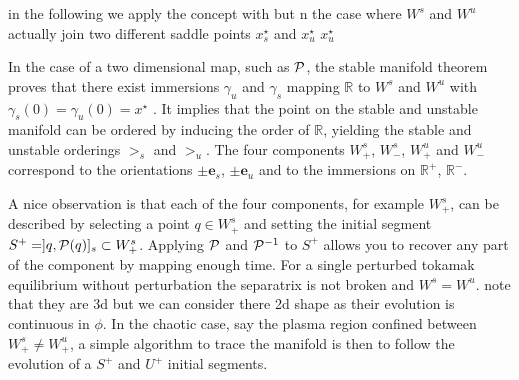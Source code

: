 in the following we apply the concept with but n the case where $W^s$ and $W^u$ actually join two different saddle points $x_s^\star$ and $x_u^\star$ $x_u^\star$

In the case of a two dimensional map, such as $\mathcal{P}$, the stable manifold theorem proves that there exist immersions $\gamma_u$ and $\gamma_s$ mapping $\mathbb{R}$ to $W^s$ and $W^u$ with $\gamma_s(0) = \gamma_u(0) = x^\star$ \cite{easton_trellises_1986}. It implies that the point on the stable and unstable manifold can be ordered by inducing the order of $\mathbb{R}$, yielding the stable and unstable orderings $>_s$ and $>_u$. The four components $W_+^s$, $W_-^s$, $W_+^u$ and $W_-^u$ correspond to the orientations $\pm\textbf{e}_s$, $\pm\textbf{e}_u$ and to the immersions on $\mathbb{R}^+$, $\mathbb{R}^-$. 

A nice observation is that each of the four components, for example $W^s_+$, can be described by selecting a point $q \in W^s_+$ and setting the initial segment $S^+ = ]q,\mathcal{P}(q)]_s \subset W^s_+$. Applying $\mathcal{P}$ and $\mathcal{P}^{-1}$ to $S^+$ allows you to recover any part of the component by mapping enough time. For a single perturbed tokamak equilibrium without perturbation the separatrix is not broken and $W^s = W^u$.
note that they are 3d but we can consider there 2d shape as their evolution is continuous in $\phi$. In the chaotic case, say the plasma region confined between $W^s_+ \neq W^u_+$, a simple algorithm to trace the manifold is then to follow the evolution of a $S^+$ and $U^+$ initial segments. 

